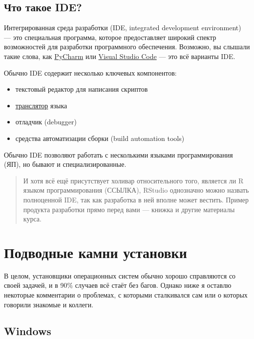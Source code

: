\documentclass[
  letterpaper,
]{scrbook}
\providecommand{\tightlist}{%
  \setlength{\itemsep}{0pt}\setlength{\parskip}{0pt}}\usepackage{longtable,booktabs,array}
\theoremstyle{definition}
\theoremstyle{remark}
\begin{document}
\subsection{Что такое IDE?}\label{rbasics-what-is-ide}

Интегрированная среда разработки (IDE, integrated development
environment) --- это специальная программа, которое предоставляет
широкий спектр возможностей для разработки программного обеспечения.
Возможно, вы слышали такие слова, как
\href{https://www.jetbrains.com/ru-ru/pycharm/}{PyCharm} или
\href{https://code.visualstudio.com/}{Visual Studio Code} --- это всё
варианты IDE.

Обычно IDE содержит несколько ключевых компонентов:

\begin{itemize}
\tightlist
\item
  текстовый редактор для написания скриптов
\item
  \hyperref[appendix_proglang]{транслятор} языка
\item
  отладчик (debugger)
\item
  средства автоматизации сборки (build automation tools)
\end{itemize}

Обычно IDE позволяют работать с несколькими языками программирования
(ЯП), но бывают и специализированные.

\begin{quote}
И хотя всё ещё присутствует холивар относительного того, является ли R
языком программирования (ССЫЛКА), RStudio однозначно можно назвать
полноценной IDE, так как разработка в ней вполне может вестить. Пример
продукта разработки прямо перед вами --- книжка и другие материалы
курса.
\end{quote}

\section{Подводные камни установки}\label{rbasics-installation-problems}

В целом, установщики операционных систем обычно хорошо справляются со
своей задачей, и в 90\% случаев всё стаёт без багов. Однако ниже я
оставлю некоторые комментарии о проблемах, с которыми сталкивался сам
или о которых говорили знакомые и коллеги.

\subsection{Windows}\label{rbasics-installation-problems-win}
\end{document}
